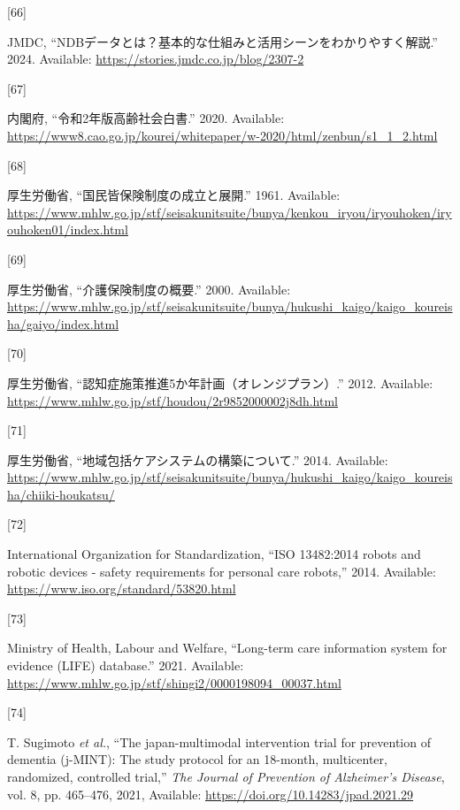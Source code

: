 \documentclass[
  a4paper,
  a4paper,
  11pt]{ltjsbook}
\newlength{\cslhangindent}
\newlength{\csllabelwidth}
\newenvironment{CSLReferences}[2] %
 {\begin{list}{}{%
  \setlength{\itemindent}{0pt}
  \setlength{\leftmargin}{0pt}
  \setlength{\parsep}{0pt}
  \ifodd #1
   \setlength{\leftmargin}{\cslhangindent}
   \setlength{\itemindent}{-1\cslhangindent}
  \fi
  \setlength{\itemsep}{#2\baselineskip}}}
 {\end{list}}
\newcommand{\CSLLeftMargin}[1]{\parbox[t]{\csllabelwidth}{\strut#1\strut}}
\newcommand{\CSLRightInline}[1]{\parbox[t]{\linewidth - \csllabelwidth}{\strut#1\strut}}
\begin{document}
\begin{CSLReferences}{0}{0}
\CSLLeftMargin{{[}66{]} }%
\CSLRightInline{JMDC,
{``NDBデータとは？基本的な仕組みと活用シーンをわかりやすく解説.''} 2024.
Available: \url{https://stories.jmdc.co.jp/blog/2307-2}}

\CSLLeftMargin{{[}67{]} }%
\CSLRightInline{内閣府, {``令和2年版高齢社会白書.''} 2020. Available:
\url{https://www8.cao.go.jp/kourei/whitepaper/w-2020/html/zenbun/s1_1_2.html}}

\CSLLeftMargin{{[}68{]} }%
\CSLRightInline{厚生労働省, {``国民皆保険制度の成立と展開.''} 1961.
Available:
\url{https://www.mhlw.go.jp/stf/seisakunitsuite/bunya/kenkou_iryou/iryouhoken/iryouhoken01/index.html}}

\CSLLeftMargin{{[}69{]} }%
\CSLRightInline{厚生労働省, {``介護保険制度の概要.''} 2000. Available:
\url{https://www.mhlw.go.jp/stf/seisakunitsuite/bunya/hukushi_kaigo/kaigo_koureisha/gaiyo/index.html}}

\CSLLeftMargin{{[}70{]} }%
\CSLRightInline{厚生労働省,
{``認知症施策推進5か年計画（オレンジプラン）.''} 2012. Available:
\url{https://www.mhlw.go.jp/stf/houdou/2r9852000002j8dh.html}}

\CSLLeftMargin{{[}71{]} }%
\CSLRightInline{厚生労働省, {``地域包括ケアシステムの構築について.''}
2014. Available:
\url{https://www.mhlw.go.jp/stf/seisakunitsuite/bunya/hukushi_kaigo/kaigo_koureisha/chiiki-houkatsu/}}

\CSLLeftMargin{{[}72{]} }%
\CSLRightInline{International Organization for Standardization, {``ISO
13482:2014 robots and robotic devices - safety requirements for personal
care robots,''} 2014. Available:
\url{https://www.iso.org/standard/53820.html}}

\CSLLeftMargin{{[}73{]} }%
\CSLRightInline{Ministry of Health, Labour and Welfare, {``Long-term
care information system for evidence (LIFE) database.''} 2021.
Available:
\url{https://www.mhlw.go.jp/stf/shingi2/0000198094_00037.html}}

\CSLLeftMargin{{[}74{]} }%
\CSLRightInline{T. Sugimoto \emph{et al.}, {``The japan-multimodal
intervention trial for prevention of dementia (j-MINT): The study
protocol for an 18-month, multicenter, randomized, controlled trial,''}
\emph{The Journal of Prevention of Alzheimer's Disease}, vol. 8, pp.
465--476, 2021, Available: \url{https://doi.org/10.14283/jpad.2021.29}}


\end{CSLReferences}
\end{document}
